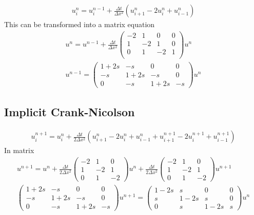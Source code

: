 \documentclass[11pt,a4paper,draft]{article}
\numberwithin{equation}{section}
\begin{document}
\begin{gather}
u_i^n = u_i^{n-1} + \frac{\Delta t}{\Delta x^2}\left(
u_{i+1}^n - 2u_i^n + u_{i-1}^n
\right)
\end{gather}
This can be transformed into a matrix equation
\begin{gather}
u^n = u^{n-1} + \frac{\Delta t}{\Delta x^2}
\begin{pmatrix}
-2 & 1 & 0 & 0\\
1 & -2 & 1 & 0\\
0 & 1 & -2 & 1\\
\end{pmatrix}u^n\\
u^{n-1} =
\begin{pmatrix}
1 + 2s & -s & 0 & 0\\
-s & 1 + 2s & -s & 0\\
0 & -s & 1 + 2s & -s
\end{pmatrix}u^n
\end{gather}

\subsection{Implicit Crank-Nicolson}
\begin{gather}
u_i^{n+1} = u_i^n + \frac{\Delta t}{2\Delta x^2}\left(
u_{i+1}^n - 2u_i^n + u_{i-1}^n + u_{i+1}^{n+1} - 2u_i^{n+1} + u_{i-1}^{n+1}
\right)
\end{gather}
In matrix
\begin{gather}
u^{n+1} = u^n + \frac{\Delta t}{2\Delta x^2}
\begin{pmatrix}
-2 & 1 & 0\\
1 & -2 & 1\\
0 & 1 & -2
\end{pmatrix} u^n
 + \frac{\Delta t}{2\Delta x^2}
\begin{pmatrix}
-2 & 1 & 0\\
1 & -2 & 1\\
0 & 1 & -2
\end{pmatrix}u^{n+1}\\
\begin{pmatrix}
1 + 2s & -s & 0 & 0\\
-s & 1 + 2s & -s & 0\\
0 & -s & 1 + 2s & -s
\end{pmatrix}
u^{n+1} = 
\begin{pmatrix}
1 - 2s & s & 0 & 0\\
s & 1 - 2s & s &  0\\
0 & s & 1 - 2s & s
\end{pmatrix}u^n
\end{gather}
\end{document}
